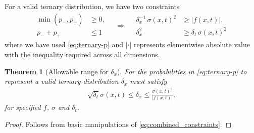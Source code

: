 \documentclass[pra,showpacs,amsmath,amssymb,amsfonts,lengthcheck,longbibliography,onecolumn]{revtex4-2}
\newtheorem{theorem}{Theorem}
\begin{document}
For a valid ternary distribution, we have two constraints
\begin{equation}\label{eq:combined_constraints}
    \begin{aligned}
      \min(p_-,p_+) &\ge 0,\\
      p_- + p_+     &\le 1
    \end{aligned}
    \quad\Longrightarrow\quad
    \begin{aligned}
      \delta_x^{-1}\,\sigma(x,t)^2 &\ge |f(x,t)|,\\
      \delta_x^2                   &\ge \delta_t\,\sigma(x,t)^2
    \end{aligned}
  \end{equation}
where we have used \eqref{eq:ternary-p} and $|\cdot|$ represents elementwise absolute
value with the inequality required across all dimensions.




\begin{theorem}[Allowable range for $\delta_x$]
    For the probabilities in \eqref{eq:ternary-p} to represent a valid ternary distribution $\delta_x$ must satisfy
    \begin{align}\label{eq:allowable}
    \sqrt{\delta_t} \sigma(x,t) \leq \delta_x \leq \frac{\sigma(x,t)^2}{|f(x,t)|},
    \end{align}
     for specified $f$, $\sigma$ and $\delta_t$.
\end{theorem}
\begin{proof}
    Follows from basic manipulations of \eqref{eq:combined_constraints}.
\end{proof}
\end{document}
